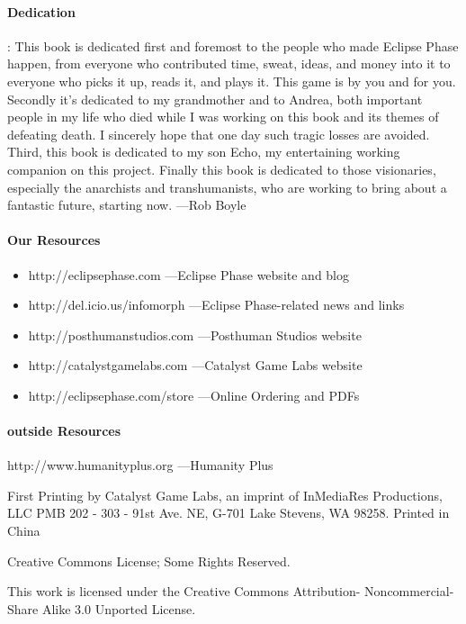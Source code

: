 \paragraph{Dedication}
\label{sec:dedication}
: This book is dedicated first and foremost to the people who made
Eclipse Phase happen, from everyone who contributed time, sweat,
ideas, and money into it to everyone who picks it up, reads it, and
plays it. This game is by you and for you.  Secondly it's dedicated to
my grandmother and to Andrea, both important people in my life who
died while I was working on this book and its themes of defeating
death. I sincerely hope that one day such tragic losses are
avoided. Third, this book is dedicated to my son Echo, my entertaining
working companion on this project. Finally this book is dedicated to
those visionaries, especially the anarchists and transhumanists, who
are working to bring about a fantastic future, starting now. —Rob
Boyle

\paragraph{Our Resources}
\label{sec:our-resources}

\begin{itemize}
\item http://eclipsephase.com —Eclipse Phase website and blog
\item http://del.icio.us/infomorph —Eclipse Phase-related news and links
\item http://posthumanstudios.com —Posthuman Studios website
\item http://catalystgamelabs.com —Catalyst Game Labs website
\item http://eclipsephase.com/store —Online Ordering and PDFs
\end{itemize}

\paragraph{outside Resources }
\label{sec:outside-resources-}

http://www.humanityplus.org —Humanity Plus

First Printing by Catalyst Game Labs, an imprint of InMediaRes
Productions, LLC PMB 202 - 303 - 91st Ave. NE, G-701 Lake Stevens, WA
98258.  Printed in China

Creative Commons License; Some Rights Reserved.

This work is licensed under the Creative Commons Attribution-
Noncommercial-Share Alike 3.0 Unported License.

